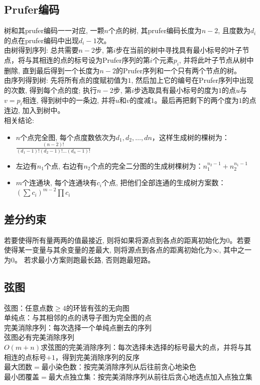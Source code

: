 	\subsection*{Prufer编码}
		树和其prufer编码一一对应, 一颗$ n $个点的树, 其prufer编码长度为$ n − 2 $, 且度数为$ d_i $的点在prufer编码中出现$ d_i − 1 $次。
		\\由树得到序列: 总共需要$ n − 2 $步, 第$ i $步在当前的树中寻找具有最小标号的叶子节点，将与其相连的点的标号设为Prufer序列的第$ i $个元素$ p_i $, 并将此叶子节点从树中删除, 直到最后得到一个长度为$ n − 2 $的Prufer序列和一个只有两个节点的树。
		\\由序列得到树: 先将所有点的度赋初值为$ 1 $, 然后加上它的编号在Prufer序列中出现的次数, 得到每个点的度; 执行$ n − 2 $步, 第$ i $步选取具有最小标号的度为$ 1 $的点$ u $与$ v = p_i$相连, 得到树中的一条边, 并将$ u $和$ v $的度减$ 1 $。最后再把剩下的两个度为$ 1 $的点连边, 加入到树中。
		\\相关结论:
		\begin{itemize}[nosep]
			\item $ n $个点完全图, 每个点度数依次为$ d_1, d_2 , \dots, dn $，这样生成树的棵树为：$ \frac{(n - 2) !}{(d_1 - 1)! (d_2 - 1)! \dots (d_n - 1)!} $
			\item 左边有$ n_1 $个点, 右边有$ n_2 $个点的完全二分图的生成树棵树为：$ n_1^{n_2 - 1} + n_2^{n_1 - 1} $
			\item $ m $个连通块, 每个连通块有$ c_i $个点, 把他们全部连通的生成树方案数：$ (\sum c_i)^{m - 2} \prod c_i $
		\end{itemize}
	\subsection*{差分约束}
		若要使得所有量两两的值最接近, 则将如果将源点到各点的距离初始化为$ 0 $。若要使得某一变量与其余变量的差最大, 则将源点到各点的距离初始化为$ \infty $, 其中之一为$ 0 $。 若求最小方案则跑最长路, 否则跑最短路。
	\subsection*{弦图}
		弦图：任意点数$ \geq 4 $的环皆有弦的无向图
		\\单纯点：与其相邻的点的诱导子图为完全图的点
		\\完美消除序列：每次选择一个单纯点删去的序列
		\\弦图必有完美消除序列
		\\$ O(m + n) $求弦图的完美消除序列：每次选择未选择的标号最大的点，并将与其相连的点标号$ + 1 $，得到完美消除序列的反序
		\\最大团数$ = $最小染色数：按完美消除序列从后往前贪心地染色
		\\最小团覆盖$ = $最大点独立集：按完美消除序列从前往后贪心地选点加入点独立集
